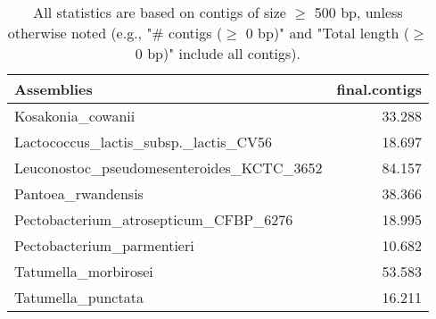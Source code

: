 \documentclass[12pt,a4paper]{article}
\begin{document}
\begin{table}[ht]
\begin{center}
\caption{All statistics are based on contigs of size $\geq$ 500 bp, unless otherwise noted (e.g., "\# contigs ($\geq$ 0 bp)" and "Total length ($\geq$ 0 bp)" include all contigs).}
\begin{tabular}{|l*{1}{|r}|}
\hline
Assemblies & final.contigs \\ \hline
Kosakonia\_cowanii & 33.288 \\ \hline
Lactococcus\_lactis\_subsp.\_lactis\_CV56 & 18.697 \\ \hline
Leuconostoc\_pseudomesenteroides\_KCTC\_3652 & 84.157 \\ \hline
Pantoea\_rwandensis & 38.366 \\ \hline
Pectobacterium\_atrosepticum\_CFBP\_6276 & 18.995 \\ \hline
Pectobacterium\_parmentieri & 10.682 \\ \hline
Tatumella\_morbirosei & 53.583 \\ \hline
Tatumella\_punctata & 16.211 \\ \hline
\end{tabular}
\end{center}
\end{table}
\end{document}
